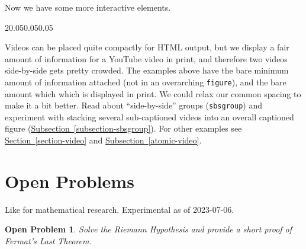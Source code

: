 \documentclass[pdflatex]{sn-jnl}
\theoremstyle{thmstyleone}%
\theoremstyle{thmstyletwo}%
\newtheorem{openproblem}[theorem]{Open Problem}
\theoremstyle{thmstylethree}%
\newcommand{\xreffont}{\relax}
\newcommand{\mono}[1]{\texttt{#1}}
\numberwithin{equation}{section}
\begin{document}
Now we have some more interactive elements.%
\begin{sidebyside}{2}{0.05}{0.05}{0.05}%
\end{sidebyside}%
\par
Videos can be placed quite compactly for HTML output, but we display a fair amount of information for a YouTube video in print, and therefore two videos side-by-side gets pretty crowded.  The examples above have the bare minimum amount of information attached (not in an overarching \mono{figure}), and the bare amount which which is displayed in print.  We could relax our common spacing to make it a bit better.  Read about ``side-by-side'' groups (\mono{sbsgroup}) and experiment with stacking several sub-captioned videos into an overall captioned figure (\hyperref[subsection-sbsgroup]{Subsection~{\xreffont\ref{subsection-sbsgroup}}}).  For other examples see \hyperref[section-video]{Section~{\xreffont\ref{section-video}}} and \hyperref[atomic-video]{Subsection~{\xreffont\ref{atomic-video}}}.%
%
%
\typeout{************************************************}
\typeout{************************************************}
%
\section{Open Problems}\label{section-open-problems}%
Like for mathematical research.  Experimental as of 2023-07-06.%
\begin{openproblem}\label{section-open-problems-3}%
%
Solve the Riemann Hypothesis\footnotemark{} \emph{and} provide a short proof of Fermat's Last Theorem.%
\end{openproblem}
%
%
%
\typeout{************************************************}
\typeout{************************************************}
%
\end{document}
